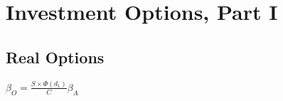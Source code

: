 \section{Investment Options, Part I}
	\subsection*{Real Options}
	$\beta_{O} = \frac{S\times\Phi\left(d_{1}\right)}{C}\beta_{A}$
	
